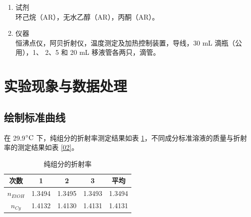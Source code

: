\documentclass[cn,hazy,pku,12pt,normal,math=newtx,cite=super]{elegantnote}
\begin{document}
\begin{enumerate} %
    \item 试剂 \\   环己烷（AR），无水乙醇（AR），丙酮（AR）。

    \item 仪器 \\   恒沸点仪，阿贝折射仪，温度测定及加热控制装置，导线，30 mL 滴瓶（公用），1、
    2、5 和 20 mL 移液管各两只，滴管。
\end{enumerate}

\section{实验现象与数据处理}
\subsection[short]{绘制标准曲线}

在 29.9$\rm \degree C$ 下，纯组分的折射率测定结果如表 \ref{01}，不同成分标准溶液的质量与折射率的测定结果如表 \ref{02}。

\begin{table}[h]
    \centering
    \caption{纯组分的折射率}
    \label{01}
    \begin{tabular}{ccccc}
    \hline
    次数         & 1      & 2      & 3      & 平均     \\ \hline
    $n_{EtOH}$ & 1.3494 & 1.3495 & 1.3493 & 1.3494 \\
    $n_{Cy}$   & 1.4132 & 1.4130 & 1.4131 & 1.4131 \\ \hline
    \end{tabular}
\end{table}
\end{document}
